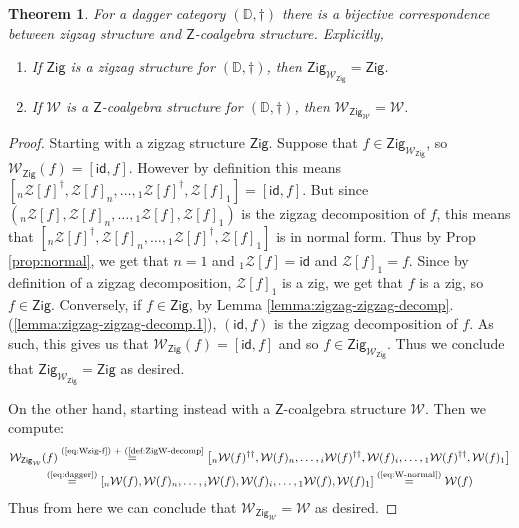 \documentclass[10pt]{article}
\newtheorem{theorem}[observation]{Theorem}
\begin{document}
\begin{theorem}\label{thm:coag=zigzag} For a dagger category $(\mathbb{D}, \dagger)$ there is a bijective correspondence between zigzag structure and $\mathsf{Z}$-coalgebra structure. Explicitly,
\begin{enumerate}[{\em (i)}]
\item If $\mathsf{Zig}$ is a zigzag structure for $(\mathbb{D}, \dagger)$, then $\mathsf{Zig}_{\mathcal{W}_\mathsf{Zig}} = \mathsf{Zig}$.
\item If $\mathcal{W}$ is a $\mathsf{Z}$-coalgebra structure for $(\mathbb{D}, \dagger)$, then $\mathcal{W}_{\mathsf{Zig}_\mathcal{W}} = \mathcal{W}$. 
\end{enumerate}
\end{theorem}
\begin{proof} Starting with a zigzag structure $\mathsf{Zig}$. Suppose that $f \in \mathsf{Zig}_{\mathcal{W}_\mathsf{Zig}}$, so $\mathcal{W}_\mathsf{Zig}(f) = [\mathsf{id},f]$. However by definition this means $\left[ {}_n\mathcal{Z}[f]^\dagger, \mathcal{Z}[f]_{n}, \hdots, {}_1\mathcal{Z}[f]^\dagger, \mathcal{Z}[f]_1 \right] = [\mathsf{id},f]$. But since $({}_n\mathcal{Z}[f], \mathcal{Z}[f]_{n}, \hdots, {}_1\mathcal{Z}[f], \mathcal{Z}[f]_1)$ is the zigzag decomposition of $f$, this means that  $\left[ {}_n\mathcal{Z}[f]^\dagger, \mathcal{Z}[f]_{n}, \hdots, {}_1\mathcal{Z}[f]^\dagger, \mathcal{Z}[f]_1 \right]$ is in normal form. Thus by Prop \ref{prop:normal}, we get that $n=1$ and ${}_1\mathcal{Z}[f]=\mathsf{id}$ and $\mathcal{Z}[f]_1=f$. Since by definition of a zigzag decomposition, $\mathcal{Z}[f]_1$ is a zig, we get that $f$ is a zig, so $f \in \mathsf{Zig}$. Conversely, if $f \in \mathsf{Zig}$, by Lemma \ref{lemma:zigzag-zigzag-decomp}.(\ref{lemma:zigzag-zigzag-decomp.1}), $(\mathsf{id},f)$ is the zigzag decomposition of $f$. As such, this gives us that $\mathcal{W}_\mathsf{Zig}(f) = [\mathsf{id},f]$ and so $f \in \mathsf{Zig}_{\mathcal{W}_\mathsf{Zig}}$. Thus we conclude that $\mathsf{Zig}_{\mathcal{W}_\mathsf{Zig}} = \mathsf{Zig}$ as desired. 

On the other hand, starting instead with a $\mathsf{Z}$-coalgebra structure $\mathcal{W}$. Then we compute: 
\begin{gather*}
\mathcal{W}_{\mathsf{Zig}_\mathcal{W}}(f)  \overset{\text{(\ref{eq:Wzig-f}) + (\ref{def:ZigW-decomp}}}{=} \left[ {}_n\mathcal{W}(f)^{\dagger\dagger} , \mathcal{W}(f)_{n}, \hdots, {}_i\mathcal{W}(f)^{\dagger\dagger}, \mathcal{W}(f)_{i}, \hdots, {}_1\mathcal{W}(f)^{\dagger\dagger}, \mathcal{W}(f)_1 \right] \\
\overset{\text{(\ref{eq:dagger})}}{=} \left[ {}_n\mathcal{W}(f), \mathcal{W}(f)_n ,\hdots ,{}_i\mathcal{W}(f),\mathcal{W}(f)_i , \hdots, {}_1 \mathcal{W}(f),\mathcal{W}(f)_1 \right] \overset{\text{(\ref{eq:W-normal})}}{=} \mathcal{W}(f) 
\end{gather*}
Thus from here we can conclude that $\mathcal{W}_{\mathsf{Zig}_\mathcal{W}} = \mathcal{W}$ as desired. 
\end{proof}
\end{document}
